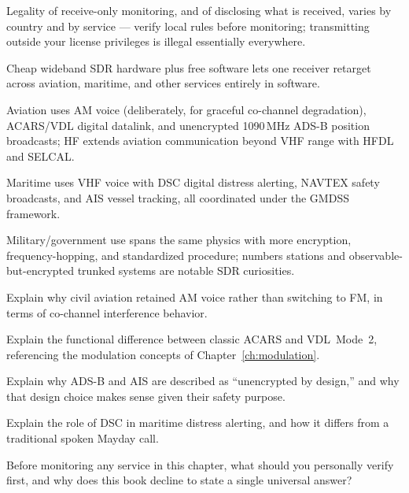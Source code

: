 \begin{quickreview}
\item Legality of receive-only monitoring, and of disclosing what is
received, varies by country and by service --- verify local rules before
monitoring; transmitting outside your license privileges is illegal
essentially everywhere.
\item Cheap wideband SDR hardware plus free software lets one receiver
retarget across aviation, maritime, and other services entirely in
software.
\item Aviation uses AM voice (deliberately, for graceful co-channel
degradation), ACARS/VDL digital datalink, and unencrypted 1090\,MHz
ADS-B position broadcasts; HF extends aviation communication beyond
VHF range with HFDL and SELCAL.
\item Maritime uses VHF voice with DSC digital distress alerting,
NAVTEX safety broadcasts, and AIS vessel tracking, all coordinated
under the GMDSS framework.
\item Military/government use spans the same physics with more
encryption, frequency-hopping, and standardized procedure; numbers
stations and observable-but-encrypted trunked systems are notable SDR
curiosities.
\end{quickreview}

\begin{practiceproblems}
\item Explain why civil aviation retained AM voice rather than
switching to FM, in terms of co-channel interference behavior.
\item Explain the functional difference between classic ACARS and
VDL~Mode~2, referencing the modulation concepts of
Chapter~\ref{ch:modulation}.
\item Explain why ADS-B and AIS are described as ``unencrypted by
design,'' and why that design choice makes sense given their safety
purpose.
\item Explain the role of DSC in maritime distress alerting, and how it
differs from a traditional spoken Mayday call.
\item Before monitoring any service in this chapter, what should you
personally verify first, and why does this book decline to state a
single universal answer?
\end{practiceproblems}

